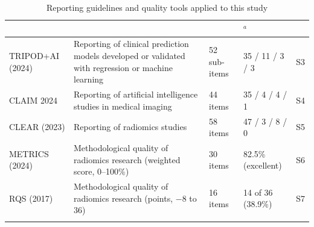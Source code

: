 \begin{table}[!tp]
\centering
\caption{Reporting guidelines and quality tools applied to this study}\label{tab:reporting}
\tabsetup
\begin{tabularx}{\textwidth}{Q{2.6cm} J P{1.9cm} P{2.9cm} P{1.6cm}}
\toprule
{} &  &  & $^{a}$ &  \\
\midrule
{}
TRIPOD+AI (2024) & Reporting of clinical prediction models developed or validated with regression or machine learning & 52 sub-items & 35 / 11 / 3 / 3 & S3 \\
CLAIM 2024 & Reporting of artificial intelligence studies in medical imaging & 44 items & 35 / 4 / 4 / 1 & S4 \\
CLEAR (2023) & Reporting of radiomics studies & 58 items & 47 / 3 / 8 / 0 & S5 \\
METRICS (2024) & Methodological quality of radiomics research (weighted score, 0--100\%) & 30 items & 82.5\% (excellent) & S6 \\
RQS (2017) & Methodological quality of radiomics research (points, $-$8 to 36) & 16 items & 14 of 36 (38.9\%) & S7 \\
\botrule
\end{tabularx}
\end{table}
